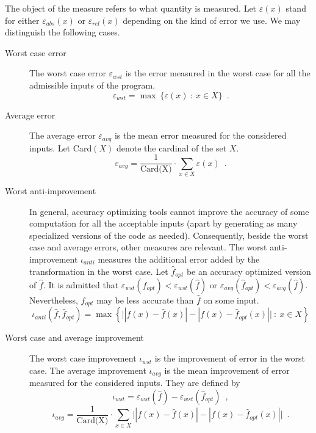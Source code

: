 The object of the measure refers to what quantity is measured.  Let $\varepsilon(x)$
stand for either $\varepsilon_{abs}(x)$ or $\varepsilon_{rel}(x)$ depending on the kind of error we use. 
We may distinguish the following cases.
\begin{description}
\item[Worst case error] The worst case error $\varepsilon_{wst}$ is the error measured in the worst case for all the admissible inputs of the program. 
\begin{equation}
\varepsilon_{wst} = \max\ \big\{ \varepsilon(x)\ :\ x\in X \big\} \enspace .
\end{equation}
\item[Average error] The average error $\varepsilon_{avg}$ is the mean error measured for the considered inputs. Let Card$(X)$ denote
the cardinal of the set $X$.
 \begin{equation}
\varepsilon_{avg} = \frac{1}{\text{Card(X)}} \cdot \sum_{x\in X} \varepsilon(x) \enspace .
\end{equation}
\item[Worst anti-improvement] In general, accuracy optimizing tools cannot improve the accuracy of some computation for
all the acceptable inputs (apart by generating as many specialized versions of the code as needed). Consequently,
beside the worst case and average errors, other measures are relevant. The worst anti-improvement $\iota_{anti}$
measures the additional error added by the transformation in the worst case. Let $\hat{f}_{opt}$ be an accuracy optimized
version of $\hat{f}$. It is admitted that $\varepsilon_{wst}(\hat{f}_{opt})< \varepsilon_{wst}(\hat{f})$
or $\varepsilon_{avg}(\hat{f}_{opt})< \varepsilon_{avg}(\hat{f})$. Nevertheless, $\hat{f}_{opt}$ may be
less accurate than $\hat{f}$ on some input.
\begin{equation}
\iota_{anti}(\hat{f},\hat{f}_{opt}) = \max \left\{ \big| |f(x)-\hat{f}(x)| - |f(x)-\hat{f}_{opt}(x)|   
\big|\ :\ x\in X\right\}
\end{equation}
\item[Worst case and average improvement] The worst case improvement $\iota_{wst}$ is the improvement of error in the worst case. The average improvement $\iota_{avg}$ is the mean improvement of error measured 
for the considered inputs.  They are defined by
 \begin{equation}
\iota_{wst} = \varepsilon_{wst}(\hat{f}) - \varepsilon_{wst}(\hat{f}_{opt})\enspace,
\end{equation}
 \begin{equation}
\iota_{avg} = \frac{1}{\text{Card(X)}} \cdot \sum_{x\in X}  \big| |f(x)-\hat{f}(x)| - |f(x)-\hat{f}_{opt}(x)|  \big|\enspace .
\end{equation}
\end{description}


